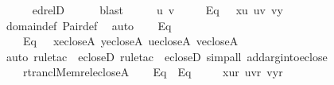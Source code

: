 \begin{isabellebody}
\ \ \ \ \isamarkupfalse%
\ edrelD\isanewline
\ \ \ \ \isamarkupfalse%
\ blast\isanewline
\ \ \isamarkupfalse%
\ \isamarkupfalse%
\ u\ v\ \isanewline
\ \ \ \ Eq{}{\isacharcolon}{\kern0pt}\ \ \ {\isachardoublequoteopen}x{\isasymin}u{\isachardoublequoteclose}\ {\isachardoublequoteopen}u{\isasymin}v{\isachardoublequoteclose}\ {\isachardoublequoteopen}v{\isasymin}y{\isachardoublequoteclose}\isanewline
\ \ \ \ \isamarkupfalse%
\ domain{\isacharunderscore}{\kern0pt}def\ Pair{\isacharunderscore}{\kern0pt}def\ \isamarkupfalse%
\ auto\isanewline
\ \ \isamarkupfalse%
\ Eq{}\ \isamarkupfalse%
\isanewline
\ \ \ \ Eq{}{\isacharcolon}{\kern0pt}\ \ \ {\isachardoublequoteopen}x{\isasymin}eclose{\isacharparenleft}{\kern0pt}A{\isacharparenright}{\kern0pt}{\isachardoublequoteclose}\ {\isachardoublequoteopen}y{\isasymin}eclose{\isacharparenleft}{\kern0pt}A{\isacharparenright}{\kern0pt}{\isachardoublequoteclose}\ {\isachardoublequoteopen}u{\isasymin}eclose{\isacharparenleft}{\kern0pt}A{\isacharparenright}{\kern0pt}{\isachardoublequoteclose}\ {\isachardoublequoteopen}v{\isasymin}eclose{\isacharparenleft}{\kern0pt}A{\isacharparenright}{\kern0pt}{\isachardoublequoteclose}\isanewline
\ \ \ \ \isamarkupfalse%
\ {\isacharparenleft}{\kern0pt}auto{\isacharcomma}{\kern0pt}\ rule{\isacharunderscore}{\kern0pt}tac\ {\isacharbrackleft}{\kern0pt}{}{\isacharminus}{\kern0pt}{}{\isacharbrackright}{\kern0pt}\ ecloseD{\isacharcomma}{\kern0pt}\ rule{\isacharunderscore}{\kern0pt}tac\ {\isacharbrackleft}{\kern0pt}{}{\isacharbrackright}{\kern0pt}\ ecloseD{\isacharcomma}{\kern0pt}\ simp{\isacharunderscore}{\kern0pt}all\ add{\isacharcolon}{\kern0pt}arg{\isacharunderscore}{\kern0pt}into{\isacharunderscore}{\kern0pt}eclose{\isacharparenright}{\kern0pt}\isanewline
\ \ \isamarkupfalse%
\isanewline
\ \ \ \ {\isacharquery}{\kern0pt}r{\isacharequal}{\kern0pt}{\isachardoublequoteopen}trancl{\isacharparenleft}{\kern0pt}Memrel{\isacharparenleft}{\kern0pt}eclose{\isacharparenleft}{\kern0pt}A{\isacharparenright}{\kern0pt}{\isacharparenright}{\kern0pt}{\isacharparenright}{\kern0pt}{\isachardoublequoteclose}\isanewline
\ \ \isamarkupfalse%
\ Eq{}\ \ Eq{}\ \isamarkupfalse%
\isanewline
\ \ \ \ {\isachardoublequoteopen}{\isasymlangle}x{\isacharcomma}{\kern0pt}u{\isasymrangle}{\isasymin}{\isacharquery}{\kern0pt}r{\isachardoublequoteclose}\ {\isachardoublequoteopen}{\isasymlangle}u{\isacharcomma}{\kern0pt}v{\isasymrangle}{\isasymin}{\isacharquery}{\kern0pt}r{\isachardoublequoteclose}\ {\isachardoublequoteopen}{\isasymlangle}v{\isacharcomma}{\kern0pt}y{\isasymrangle}{\isasymin}{\isacharquery}{\kern0pt}r{\isachardoublequoteclose}\isanewline

\end{isabellebody}
